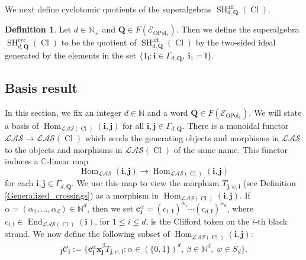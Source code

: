 \documentclass[11pt]{amsart}
\newcommand\go{\mathsf{I}}              %
\theoremstyle{definition}
\newtheorem{defn}[theo]{Definition}
\numberwithin{equation}{section}
\begin{document}
We next define cyclotomic quotients of the superalgebras $ \operatorname{SH}_{d,\mathbf{Q}}^{\operatorname{aff}}(\operatorname{Cl}) $.

\begin{defn} 
Let $ d \in \mathbb{N}_{+} $ and $ \mathbf{Q} \in F(\mathcal{E}_{\operatorname{OPol}_{1}}) $. Then we define the superalgebra $ \operatorname{SH}^{\operatorname{cyc}}_{d,\mathbf{Q}}(\operatorname{Cl}) $ to be the quotient of $ \operatorname{SH}^{\operatorname{aff}}_{d,\mathbf{Q}}(\operatorname{Cl}) $ by the two-sided ideal generated by the elements in the set $ \{1_{\mathbf{i}} : \mathbf{i} \in \Gamma_{d,\mathbf{Q}}, \ \mathbf{i}_{1} = \go \} $.
\end{defn}


\subsection{Basis result}

In this section, we fix an integer $ d \in \mathbb{N} $ and a word $ \mathbf{Q} \in F(\mathcal{E}_{\operatorname{OPol}_{1}}) $. We will state a basis of $ \operatorname{Hom}_{\mathcal{LAS}(\operatorname{Cl})}(\mathbf{i}, \mathbf{j}) $ for all $ \mathbf{i}, \mathbf{j} \in \Gamma_{d,\mathbf{Q}} $. There is a monoidal functor $ \mathcal{LAS} \rightarrow \mathcal{LAS}(\operatorname{Cl}) $ which sends the generating objects and morphisms in $ \mathcal{LAS} $ to the objects and morphisms in $ \mathcal{LAS}(\operatorname{Cl}) $ of the same name. This functor induces a $ \mathbb{C} $-linear map
\begin{equation*}
\operatorname{Hom}_{\mathcal{LAS}}(\mathbf{i},\mathbf{j}) \rightarrow \operatorname{Hom}_{\mathcal{LAS}(\operatorname{Cl})}(\mathbf{i},\mathbf{j})
\end{equation*}
for each $ \mathbf{i}, \mathbf{j} \in \Gamma_{d,\mathbf{Q}} $. We use this map to view the morphism $ T_{\mathbf{j},w,\mathbf{i}} $ (see Definition \ref{Generalized_crossings}) as a morphism in $ \operatorname{Hom}_{\mathcal{LAS}(\operatorname{Cl})}(\mathbf{i},\mathbf{j}) $. If $ \alpha = (\alpha_{1},\ldots,\alpha_{d}) \in \mathbb{N}^{d} $, then we set $ \mathbf{c}_{\mathbf{i}}^{\alpha} = (c_{1,\mathbf{i}})^{\alpha_{1}}\cdots (c_{d,\mathbf{i}})^{\alpha_{d}} $, where $ c_{i,\mathbf{i}} \in \operatorname{End}_{\mathcal{LAS}(\operatorname{Cl})}(\mathbf{i}) $, for $ 1 \leq i \leq d $, is the Clifford token on the \(i\)-th black strand. We now define the following subset of $ \operatorname{Hom}_{\mathcal{LAS}(\operatorname{Cl})}(\mathbf{i}, \mathbf{j}) $:
\begin{align*}
_{\mathbf{j}} \mathcal{C}_{\mathbf{i}} := \{\mathbf{c}_{\mathbf{j}}^{\alpha}\mathbf{x}_{\mathbf{j}}^{\beta}T_{\mathbf{j},w,\mathbf{i}} : \alpha \in (\{0,1\})^{d}, \ \beta \in \mathbb{N}^{d}, \ w \in S_{d} \}.
\end{align*}
\end{document}
